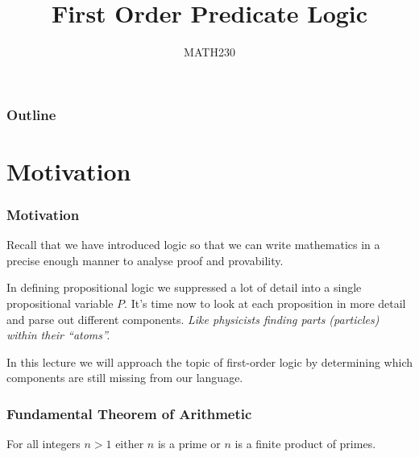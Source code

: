 \documentclass{beamer}
\title{First Order Predicate Logic}
\author{MATH230}
\institute{Te Kura P\=angarau \\ Te Whare W\=ananga o Waitaha}
\date{}
\theoremstyle{indentDefn} \newtheorem{defn}[]{Definition}
\begin{document}
\begin{frame}

  \titlepage

\end{frame}

\begin{frame}
  \frametitle{Outline}

  \tableofcontents

\end{frame}

\section{Motivation}

\begin{frame}
  \frametitle{Motivation}

  Recall that we have introduced logic so that we can write mathematics in a precise enough manner to analyse proof and provability. 
  
  \vspace{5mm}
  
	In defining propositional logic we suppressed a lot of detail into a single propositional variable $P$. It's time now to look at each proposition in more detail and parse out different components. \emph{Like physicists finding parts (particles) within their ``atoms''.}
  
  \vspace{5mm} 
  
  In this lecture we will approach the topic of first-order logic by determining which components are still missing from our language. 
\end{frame}


\begin{frame}
	\frametitle{Fundamental Theorem of Arithmetic}
	
	For all integers $n > 1$ either $n$ is a prime or $n$ is a finite product of primes. 
	
	\vspace{60mm}
\end{frame}
\end{document}
